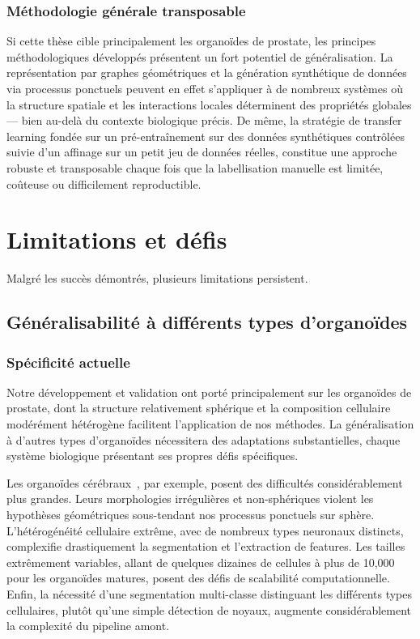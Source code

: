 \subsubsection{Méthodologie générale transposable}
Si cette thèse cible principalement les organoïdes de prostate, les principes méthodologiques développés présentent un fort potentiel de généralisation. La représentation par graphes géométriques et la génération synthétique de données via processus ponctuels peuvent en effet s'appliquer à de nombreux systèmes où la structure spatiale et les interactions locales déterminent des propriétés globales — bien au-delà du contexte biologique précis. De même, la stratégie de transfer learning fondée sur un pré-entraînement sur des données synthétiques contrôlées suivie d'un affinage sur un petit jeu de données réelles, constitue une approche robuste et transposable chaque fois que la labellisation manuelle est limitée, coûteuse ou difficilement reproductible.

\section{Limitations et défis}

Malgré les succès démontrés, plusieurs limitations persistent.

\subsection{Généralisabilité à différents types d'organoïdes}

\subsubsection{Spécificité actuelle}

Notre développement et validation ont porté principalement sur les organoïdes de prostate, dont la structure relativement sphérique et la composition cellulaire modérément hétérogène facilitent l'application de nos méthodes. La généralisation à d'autres types d'organoïdes nécessitera des adaptations substantielles, chaque système biologique présentant ses propres défis spécifiques.

Les organoïdes cérébraux~\cite{Lancaster2013}, par exemple, posent des difficultés considérablement plus grandes. Leurs morphologies irrégulières et non-sphériques violent les hypothèses géométriques sous-tendant nos processus ponctuels sur sphère. L'hétérogénéité cellulaire extrême, avec de nombreux types neuronaux distincts, complexifie drastiquement la segmentation et l'extraction de features. Les tailles extrêmement variables, allant de quelques dizaines de cellules à plus de 10,000 pour les organoïdes matures, posent des défis de scalabilité computationnelle. Enfin, la nécessité d'une segmentation multi-classe distinguant les différents types cellulaires, plutôt qu'une simple détection de noyaux, augmente considérablement la complexité du pipeline amont.

